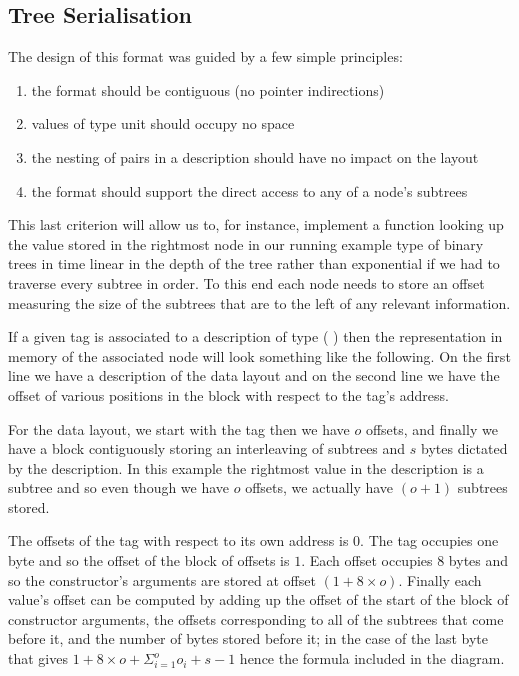 \subsection{Tree Serialisation}\label{sec:tree-serialisation}

The design of this format was guided by a few simple principles:
\begin{enumerate}
  \item the format should be contiguous (no pointer indirections)
  \item values of type unit should occupy no space
  \item the nesting of pairs in a description should have no impact on the layout
  \item the format should support the direct access to any of a node's subtrees
\end{enumerate}
%
This last criterion will allow us to, for instance,
implement a function looking up the value stored
in the rightmost node in our running example type
of binary trees in time linear in the depth of the tree
rather than exponential if we had to traverse every subtree in order.
%
To this end each node needs to store an offset measuring the size of the
subtrees that are to the left of any relevant information.

If a given tag is associated to a description of type
(   )
then the representation in memory of the associated node will look something
like the following.
%
On the first line we have a description of the data layout and on the
second line we have the offset of various positions in the block with
respect to the tag's address.

\label{fig:data-layout}
\begin{center}

\end{center}


For the data layout,
we start with the tag
then we have $o$ offsets,
and finally we have a block contiguously storing an interleaving of
subtrees and $s$ bytes
dictated by the description.
%
In this example the rightmost value in the description is a subtree and
so even though we have $o$ offsets, we actually have $(o+1)$ subtrees stored.

The offsets of the tag with respect to its own address is $0$.
The tag occupies one byte and so the offset of the block of offsets is $1$.
Each offset occupies 8 bytes and so the constructor's arguments
are stored at offset $(1+8\times{}o)$.
Finally each value's offset can be computed by adding up
the offset of the start of the block of constructor arguments,
the offsets corresponding to all of the subtrees that come before it,
and the number of bytes stored before it;
in the case of the last byte that gives $1+8\times{}o + \Sigma_{i=1}^{o}o_i + s-1$
hence the formula included in the diagram.

